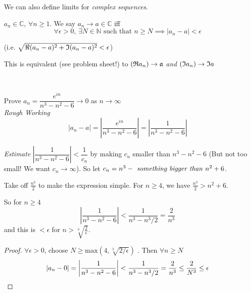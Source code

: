 We can also define limits for \emph{complex sequences}.\\

\begin{definition}
$a_n \in \mathbb{C},~\forall n \geq 1$. We say $a_n \to a \in \mathbb{C}$ iff
\[\forall \epsilon >0,~\exists N \in \mathbb{N} \text{ such that } n \geq N \implies |a_n - a| < \epsilon\]	

(i.e. $\sqrt{\Re(a_n-a)^2 + \frak{I}(a_n-a)^2} < \epsilon$) 

This is equivalent (see problem sheet!) to $(\frak{R}a_n) \to \frak{a}$ \emph{and} $(\frak{I}a_n) \to \frak{I}a$
\end{definition}~

\begin{example}
Prove $a_n = \dfrac{e^{in}}{n^3-n^2-6} \to 0$ as $n \to \infty$\\

\emph{Rough Working} 
\[|a_n - a| = \left|\dfrac{e^{in}}{n^3-n^2-6} \right| = \left|\frac{1}{n^3-n^2-6}\right|\]

\emph{Estimate} $\left|\dfrac{1}{n^3-n^2-6}\right| < \dfrac{1}{c_n}$ by making $c_n$ smaller than $n^3 - n^2 - 6$ (But not too small! We want $c_n \to \infty$). So let $c_n = n^3 - \text{\emph{ something bigger than} } n^2 + 6$.

Take off $\frac{n^3}{2}$ to make the expression simple. For $n \geq 4$, we have $\frac{n^3}{2} > n^2 + 6$. 

So for $n \geq 4$
\[\left|\frac{1}{n^3-n^2-6}\right| < \frac{1}{n^3- n^3/2} = \frac{2}{n^3} \]
and this is $< \epsilon$ for $n > \sqrt[3]{\frac{2}{\epsilon}}$.

\begin{proof}
$\forall \epsilon > 0$, choose $N \geq \mathrm{max}(4,\sqrt[3]{2/\epsilon})$	. Then $\forall n \geq N$
\[|a_n - 0| = \left| \frac{1}{n^3-n^2 - 6}\right| < \frac{1}{n^3- n^3/2} = \frac{2}{n^3} \leq \frac{2}{N^3} \leq \epsilon \qedhere \]
\end{proof}
\end{example}~


